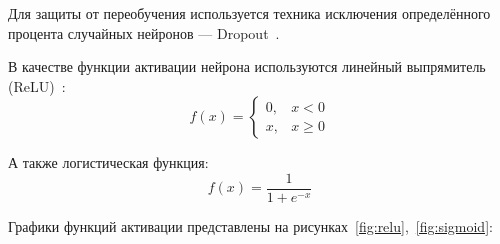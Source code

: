 Для защиты от переобучения используется техника исключения определённого процента случайных нейронов --- Dropout~\cite{dropout}.

В качестве функции активации нейрона используются линейный выпрямитель (ReLU)~\cite{relu}:
\begin{equation}
f(x) =
\begin{cases}
    0, & x < 0 \\
    x, & x \geq 0
\end{cases}\label{eq:relu}
\end{equation}

А также логистическая функция:
\begin{equation}
    f(x) = \frac{1}{1 + e^{-x}}\label{eq:sigmoid}
\end{equation}

\pagebreak
Графики функций активации представлены на рисунках~\ref{fig:relu},~\ref{fig:sigmoid}:
